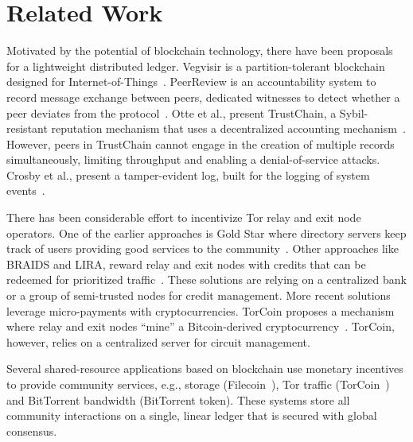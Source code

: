 
\section{Related Work}
Motivated by the potential of blockchain technology, there have been proposals for a lightweight distributed ledger.
Vegvisir is a partition-tolerant blockchain designed for Internet-of-Things~\cite{karlsson2018vegvisir}.
PeerReview is an accountability system to record message exchange between peers, dedicated witnesses to detect whether a peer deviates from the protocol~\cite{haeberlen2007peerreview}.
Otte et al., present TrustChain, a Sybil-resistant reputation mechanism that uses a decentralized accounting mechanism~\cite{otte2017trustchain}.
However, peers in TrustChain cannot engage in the creation of multiple records simultaneously, limiting throughput and enabling a denial-of-service attacks.
Crosby et al., present a tamper-evident log, built for the logging of system events~\cite{crosby2009efficient}.

There has been considerable effort to incentivize Tor relay and exit node operators.
One of the earlier approaches is Gold Star where directory servers keep track of users providing good services to the community~\cite{dingledine2010building}.
Other approaches like BRAIDS and LIRA, reward relay and exit nodes with credits that can be redeemed for prioritized traffic~\cite{jansen2010recruiting,jansen2013lira}.
These solutions are relying on a centralized bank or a group of semi-trusted nodes for credit management.
More recent solutions leverage micro-payments with cryptocurrencies.
TorCoin proposes a mechanism where relay and exit nodes \enquote{mine} a Bitcoin-derived cryptocurrency~\cite{ghosh2014torpath}.
TorCoin, however, relies on a centralized server for circuit management.

Several shared-resource applications based on blockchain use monetary incentives to provide community services, e.g., storage (Filecoin~\cite{benet2018filecoin}), Tor traffic (TorCoin~\cite{ghosh2014torpath}) and BitTorrent bandwidth (BitTorrent token).
These systems store all community interactions on a single, linear ledger that is secured with global consensus.

